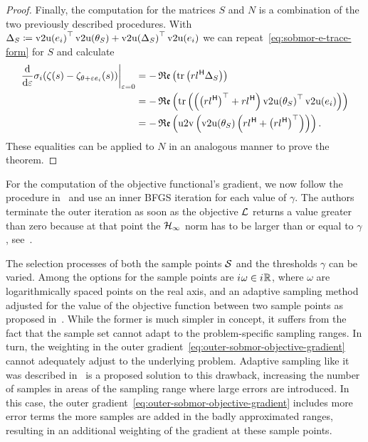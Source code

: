 \begin{proof}
    Finally, the computation for the matrices $S$ and $N$ is a combination of the two previously described procedures.
    With $\Delta_S \coloneqq {\mathop{}\!\mathrm{v}2\mathrm{u}(e_i)}^{\top} \mathop{}\!\mathrm{v}2\mathrm{u}(\theta_S) + {\mathop{}\!\mathrm{v}2\mathrm{u}(\Delta_S)}^{\top} \mathop{}\!\mathrm{v}2\mathrm{u}(e_i)$ we can repeat~\eqref{eq:sobmor-e-trace-form} for $S$ and calculate
    \begin{equation*}
        \begin{aligned}
            \res{\frac{\dif}{\dif \varepsilon} \sigma_i(\tfunc(s) - \tfunc_{\theta + \varepsilon e_i}(s))}{\varepsilon = 0} &= - \re{\trace{r l\herm \Delta_S}} \\
            &= - \re{\trace{\left( {\left( r l\herm \right)}\trans + r l\herm \right) {\vecupper(\theta_S)}\trans \vecupper(e_i)}} \\
            &= - \re{\uppervec\left( \vecupper(\theta_S) \left( r l\herm + {\left( r l\herm \right)}\trans \right) \right)}.
        \end{aligned}
    \end{equation*}
    These equalities can be applied to $N$ in an analogous manner to prove the theorem.
\end{proof}

For the computation of the objective functional's gradient, we now follow the procedure in~\cite{SV2023} and use an inner \ac{BFGS} iteration for each value of $\gamma$.
The authors terminate the outer iteration as soon as the objective $\mathcal{L}$ returns a value greater than zero because at that point the $\mathcal{H}_\infty$ norm has to be larger than or equal to $\gamma$, see~\cite[Section~3.2.2]{SV2023}.

The selection processes of both the sample points $\mathcal{S}$ and the thresholds $\gamma$ can be varied.
Among the options for the sample points are ${i\mkern1mu} \omega \in {i\mkern1mu} \mathbb{R}$, where $\omega$ are logarithmically spaced points on the real axis, and an adaptive sampling method adjusted for the value of the objective function between two sample points as proposed in~\cite{SV2021}.
While the former is much simpler in concept, it suffers from the fact that the sample set cannot adapt to the problem-specific sampling ranges.
In turn, the weighting in the outer gradient~\eqref{eq:outer-sobmor-objective-gradient} cannot adequately adjust to the underlying problem.
Adaptive sampling like it was described in~\cite{SV2021} is a proposed solution to this drawback, increasing the number of samples in areas of the sampling range where large errors are introduced.
In this case, the outer gradient~\eqref{eq:outer-sobmor-objective-gradient} includes more error terms the more samples are added in the badly approximated ranges, resulting in an additional weighting of the gradient at these sample points.
